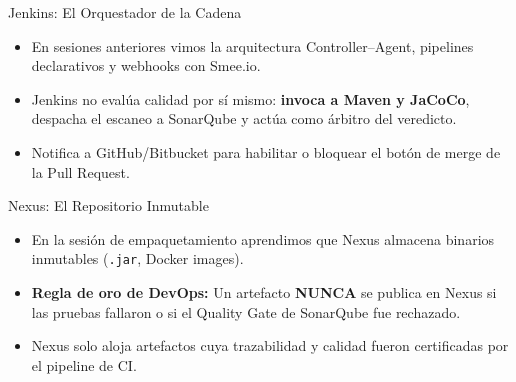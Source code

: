 \documentclass[aspectratio=169]{beamer}
\begin{document}
  {Jenkins: El Orquestador de la Cadena}
  {
    {\small
    \begin{itemize}
      \setlength{\itemsep}{2pt}
      \item En sesiones anteriores vimos la arquitectura Controller--Agent, pipelines declarativos y webhooks con Smee.io.
      \item Jenkins no evalúa calidad por sí mismo: \textbf{invoca a Maven y JaCoCo}, despacha el escaneo a SonarQube y actúa como árbitro del veredicto.
      \item Notifica a GitHub/Bitbucket para habilitar o bloquear el botón de merge de la Pull Request.
    \end{itemize}
    }
  }
  {Nexus: El Repositorio Inmutable}
  {
    {\small
    \begin{itemize}
      \setlength{\itemsep}{2pt}
      \item En la sesión de empaquetamiento aprendimos que Nexus almacena binarios inmutables (\texttt{.jar}, Docker images).
      \item \textbf{Regla de oro de DevOps:} Un artefacto \textbf{NUNCA} se publica en Nexus si las pruebas fallaron o si el Quality Gate de SonarQube fue rechazado.
      \item Nexus solo aloja artefactos cuya trazabilidad y calidad fueron certificadas por el pipeline de CI.
    \end{itemize}
    }
  }
\end{document}

